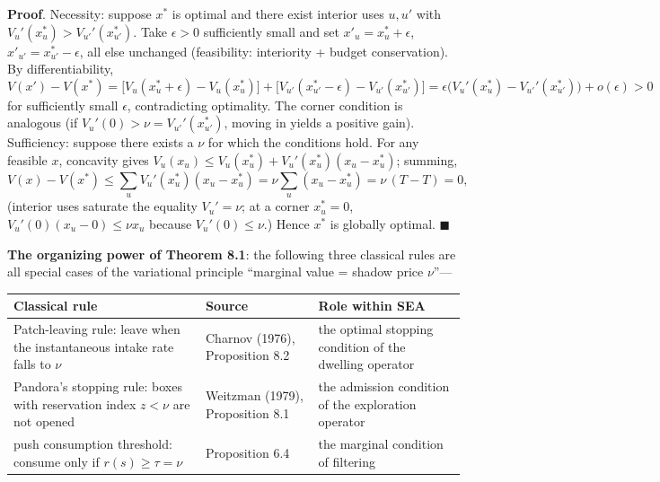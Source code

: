 \documentclass[
  11pt]{article}
\begin{document}
\textbf{Proof}. Necessity: suppose \(x^*\) is optimal and there exist
interior uses \(u, u'\) with \(V_u'(x_u^*) > V_{u'}'(x_{u'}^*)\). Take
\(\epsilon > 0\) sufficiently small and set \(x'_u = x_u^* + \epsilon\),
\(x'_{u'} = x_{u'}^* - \epsilon\), all else unchanged (feasibility:
interiority + budget conservation). By differentiability,
\[V(x') - V(x^*) = \big[V_u(x_u^*+\epsilon) - V_u(x_u^*)\big] + \big[V_{u'}(x_{u'}^*-\epsilon) - V_{u'}(x_{u'}^*)\big] = \epsilon\big(V_u'(x_u^*) - V_{u'}'(x_{u'}^*)\big) + o(\epsilon) > 0\]
for sufficiently small \(\epsilon\), contradicting optimality. The
corner condition is analogous (if \(V_u'(0) > \nu = V_{u'}'(x_{u'}^*)\),
moving in yields a positive gain). Sufficiency: suppose there exists a
\(\nu\) for which the conditions hold. For any feasible \(x\), concavity
gives \(V_u(x_u) \le V_u(x_u^*) + V_u'(x_u^*)(x_u - x_u^*)\); summing,
\[V(x) - V(x^*) \le \sum_u V_u'(x_u^*)(x_u - x_u^*) = \nu \sum_u (x_u - x_u^*) = \nu\,(T - T) = 0,\]
(interior uses saturate the equality \(V_u' = \nu\); at a corner
\(x_u^* = 0\), \(V_u'(0)(x_u - 0) \le \nu x_u\) because
\(V_u'(0) \le \nu\).) Hence \(x^*\) is globally optimal.
\(\blacksquare\)

\textbf{The organizing power of Theorem 8.1}: the following three
classical rules are all special cases of the variational principle
``marginal value = shadow price \(\nu\)''---

\begin{longtable}[]{@{}
  >{\raggedright\arraybackslash}p{}
  >{\raggedright\arraybackslash}p{}
  >{\raggedright\arraybackslash}p{}@{}}
\toprule\noalign{}
\begin{minipage}[b]{\linewidth}\raggedright
Classical rule
\end{minipage} & \begin{minipage}[b]{\linewidth}\raggedright
Source
\end{minipage} & \begin{minipage}[b]{\linewidth}\raggedright
Role within SEA
\end{minipage} \\
\midrule\noalign{}
\endhead
\bottomrule\noalign{}
\endlastfoot
Patch-leaving rule: leave when the instantaneous intake rate falls to
\(\nu\) & Charnov (1976), Proposition 8.2 & the optimal stopping
condition of the dwelling operator \\
Pandora's stopping rule: boxes with reservation index \(z < \nu\) are
not opened & Weitzman (1979), Proposition 8.1 & the admission condition
of the exploration operator \\
push consumption threshold: consume only if \(r(s) \ge \tau = \nu\) &
Proposition 6.4 & the marginal condition of filtering \\
\end{longtable}
\end{document}
